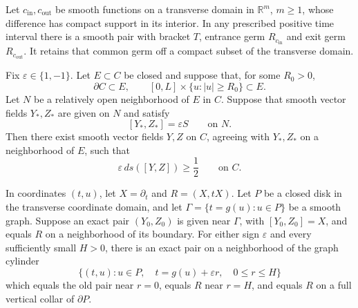 \documentclass[10pt,a4paper]{amsart}
\begin{document}
\begin{lemma}\label{lem:scalar}
Let $c_{\mathrm{in}},c_{\mathrm{out}}$ be smooth functions on a transverse domain in $\mathbb R^m$, $m\ge1$, whose difference has compact support in its interior. In any prescribed positive time interval there is a smooth pair with bracket $T$, entrance germ $R_{c_{\mathrm{in}}}$ and exit germ $R_{c_{\mathrm{out}}}$. It retains that common germ off a compact subset of the transverse domain.
\end{lemma}

\begin{lemma}
\label{lem:positive}
Fix $\varepsilon\in\{1,-1\}$. Let $E\subset C$ be closed and
suppose that, for some $R_0>0$,
$$
  \partial C\subset E,
  \qquad
  [0,L]\times\{u:|u|\geq R_0\}\subset E.
$$
Let $N$ be a relatively open neighborhood of $E$ in $C$.
Suppose that smooth vector fields $Y_*,Z_*$ are given on $N$ and
satisfy
$$
  [Y_*,Z_*]=\varepsilon S
  \qquad\text{on }N.
$$
Then there exist smooth vector fields $Y,Z$ on $C$,
agreeing with $Y_*,Z_*$ on a neighborhood of $E$, such that
$$
  \varepsilon\,ds([Y,Z])\geq\frac12
  \qquad\text{on }C.
$$
\end{lemma}

\begin{proposition}
\label{prop:graph}
In coordinates $(t,u)$, let $X=\partial_t$ and $R=(X,tX)$. Let $P$ be a closed disk in the transverse coordinate domain, and let $\Gamma=\{t=g(u):u\in P\}$ be a smooth graph. Suppose an exact pair $(Y_0,Z_0)$ is given near $\Gamma$, with $[Y_0,Z_0]=X$, and equals $R$ on a neighborhood of its boundary. For either sign $\varepsilon$ and every sufficiently small $H>0$, there is an exact pair on a neighborhood of the graph cylinder
$$
 \{(t,u):u\in P,\quad t=g(u)+\varepsilon r,\quad0\le r\le H\}
$$
which equals the old pair near $r=0$, equals $R$ near $r=H$, and equals $R$ on a full vertical collar of $\partial P$.
\end{proposition}
\end{document}
